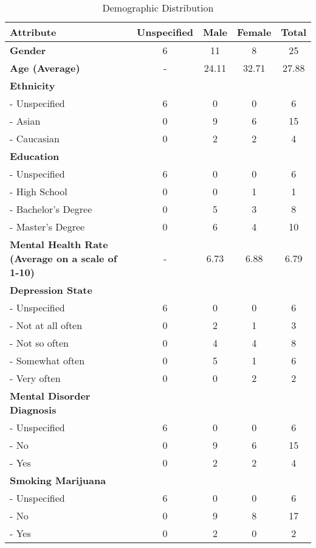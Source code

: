 \begin{table}
\centering
\small
\caption{\label{tab:demographic} Demographic Distribution}  %
\setlength{\tabcolsep}{4pt}  %
\begin{tabular}{lcccc}
\toprule
\textbf{Attribute} & \textbf{Unspecified} & \textbf{Male} & \textbf{Female} & \textbf{Total} \\
\midrule
\textbf{Gender} & 6 & 11 & 8 & 25 \\
\textbf{Age (Average)} & - & 24.11 & 32.71 & 27.88 \\
\textbf{Ethnicity} &  &  &  &  \\
- Unspecified & 6 & 0 & 0 & 6 \\
- Asian & 0 & 9 & 6 & 15 \\
- Caucasian & 0 & 2 & 2 & 4 \\
\textbf{Education} &  &  &  &  \\
- Unspecified & 6 & 0 & 0 & 6 \\
- High School & 0 & 0 & 1 & 1 \\
- Bachelor's Degree & 0 & 5 & 3 & 8 \\
- Master's Degree & 0 & 6 & 4 & 10 \\
\textbf{Mental Health Rate (Average on a scale of 1-10)} & - & 6.73 & 6.88 & 6.79 \\
\textbf{Depression State} &   &   &   &   \\
- Unspecified & 6 & 0 & 0 & 6 \\
- Not at all often & 0 & 2 & 1 & 3 \\
- Not so often & 0 & 4 & 4 & 8 \\
- Somewhat often & 0 & 5 & 1 & 6 \\
- Very often & 0 & 0 & 2 & 2 \\
\textbf{Mental Disorder Diagnosis} &  &  &  &  \\
- Unspecified & 6 & 0 & 0 & 6 \\
- No & 0 & 9 & 6 & 15 \\
- Yes & 0 & 2 & 2 & 4 \\
\textbf{Smoking Marijuana} &  &  &  &  \\
- Unspecified & 6 & 0 & 0 & 6 \\ 
- No & 0 & 9 & 8 & 17 \\ 
- Yes & 0 & 2 & 0 & 2 \\
\bottomrule
\end{tabular}
\end{table}



